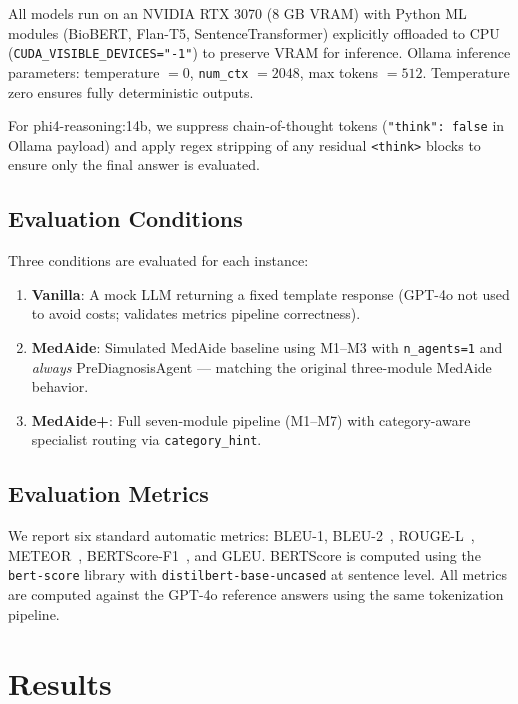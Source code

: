 \documentclass[conference]{IEEEtran}
\begin{document}
All models run on an NVIDIA RTX 3070 (8 GB VRAM) with Python ML modules (BioBERT,
Flan-T5, SentenceTransformer) explicitly offloaded to CPU
(\texttt{CUDA\_VISIBLE\_DEVICES="-1"}) to preserve VRAM for inference.
Ollama inference parameters: temperature $= 0$, \texttt{num\_ctx} $= 2048$,
max tokens $= 512$. Temperature zero ensures fully deterministic outputs.

For phi4-reasoning:14b, we suppress chain-of-thought tokens (\texttt{"think": false}
in Ollama payload) and apply regex stripping of any residual \texttt{<think>} blocks
to ensure only the final answer is evaluated.

\subsection{Evaluation Conditions}

Three conditions are evaluated for each instance:
\begin{enumerate}
  \item \textbf{Vanilla}: A mock LLM returning a fixed template response (GPT-4o not 
    used to avoid costs; validates metrics pipeline correctness).
  \item \textbf{MedAide}: Simulated MedAide baseline using M1–M3 with
    \texttt{n\_agents=1} and \emph{always} PreDiagnosisAgent — matching
    the original three-module MedAide behavior.
  \item \textbf{MedAide+}: Full seven-module pipeline (M1–M7) with
    category-aware specialist routing via \texttt{category\_hint}.
\end{enumerate}

\subsection{Evaluation Metrics}

We report six standard automatic metrics: BLEU-1, BLEU-2~\cite{papineni2002bleu},
ROUGE-L~\cite{lin2004rouge}, METEOR~\cite{banerjee2005meteor},
BERTScore-F1~\cite{zhang2020bertscore}, and GLEU. BERTScore is computed using the
\texttt{bert-score} library with \texttt{distilbert-base-uncased} at sentence level.
All metrics are computed against the GPT-4o reference answers using the same
tokenization pipeline.

\section{Results}
\label{sec:results}
\end{document}
